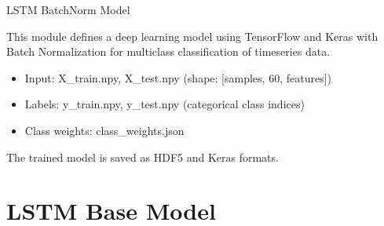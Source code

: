 \documentclass[letterpaper,10pt,english]{sphinxmanual}
\begin{document}
\begin{fulllineitems}
\label{\detokenize{lstm_bathnorm_model:lstm_bathnorm_model.train_batchnorm_model}}
\pysigstartsignatures
{}
\pysigstopsignatures
\sphinxAtStartPar
LSTM BatchNorm Model

\sphinxAtStartPar
This module defines a deep learning model using TensorFlow and Keras with Batch Normalization
for multi\sphinxhyphen{}class classification of time\sphinxhyphen{}series data.
\begin{description}
\begin{itemize}
\item {} 
\sphinxAtStartPar
Input: X\_train.npy, X\_test.npy (shape: {[}samples, 60, features{]})

\item {} 
\sphinxAtStartPar
Labels: y\_train.npy, y\_test.npy (categorical class indices)

\item {} 
\sphinxAtStartPar
Class weights: class\_weights.json

\end{itemize}

\end{description}

\sphinxAtStartPar
The trained model is saved as HDF5 and Keras formats.

\end{fulllineitems}


\sphinxstepscope


\chapter{LSTM Base Model}
\label{\detokenize{lstm_base_model:module-lstm_base_model}}\label{\detokenize{lstm_base_model:lstm-base-model}}\label{\detokenize{lstm_base_model::doc}}
\end{document}
